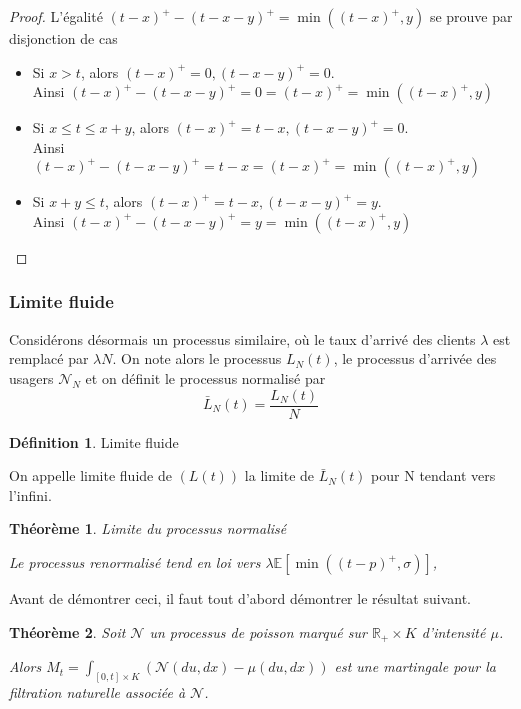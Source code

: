 \documentclass[12pt,a4paper]{article}
\newcommand{\E}[1]{\mathbb{E}\left[ #1 \right]}
\newcommand{\R}{\mathbb{R}}
\newcommand{\1}[1]{\mathbbm{1}_{\{#1\}} }
\newtheorem{theorem}{Théorème}
\theoremstyle{definition}
\newtheorem{definition}{Définition}
\begin{document}
{\begin{proof}
L'égalité $(t-x)^+-(t-x-y)^+ =  \min((t-x)^+,y)$ se prouve par disjonction de cas
\begin{itemize}
\item Si $x>t$, alors $(t-x)^+= 0, (t-x-y)^+ = 0$.\\
Ainsi $(t-x)^+-(t-x-y)^+ = 0 = (t-x)^+ = \min((t-x)^+,y)$

\item Si $x\leq t \leq x+y$, alors  $(t-x)^+= t-x, (t-x-y)^+ = 0$.\\
Ainsi $(t-x)^+-(t-x-y)^+ = t-x = (t-x)^+ = \min((t-x)^+,y)$

\item Si $x+y \leq t$, alors  $(t-x)^+= t-x, (t-x-y)^+ = y$.\\
Ainsi $(t-x)^+-(t-x-y)^+ = y = \min((t-x)^+,y)$ 
\end{itemize}
\end{proof}

\subsubsection{Limite fluide}
Considérons désormais un processus similaire, où le taux d'arrivé des clients $\lambda$ est remplacé par $\lambda N$. On note alors le processus $L_N(t)$, le processus d'arrivée des usagers $\mathcal{N}_N$ et on définit le processus normalisé par 
$$ \bar{L}_N(t) = \frac{L_N(t)}{N}$$


\begin{definition}{Limite fluide}

On appelle limite fluide de $(L(t)) $ la limite de $\bar{L}_N(t)$ pour N tendant vers l'infini.
\end{definition}

\begin{theorem}{Limite du processus normalisé}

Le processus renormalisé tend en loi vers $\lambda\E{\min((t-p)^+,\sigma)}$, 

\end{theorem}

Avant de démontrer ceci, il faut tout d'abord démontrer le résultat suivant.
\begin{theorem}{ }
\label{processus_croissant}
Soit $\mathcal{N}$ un processus de poisson marqué sur $\R_+ \times K$ d'intensité $\mu$.

Alors $M_t = \int_{[0,t] \times K} \left(\mathcal{N}(du,dx) - \mu(du,dx)\right)$ est une martingale pour la filtration naturelle associée à $\mathcal{N}$.


\end{theorem}}
\end{document}
